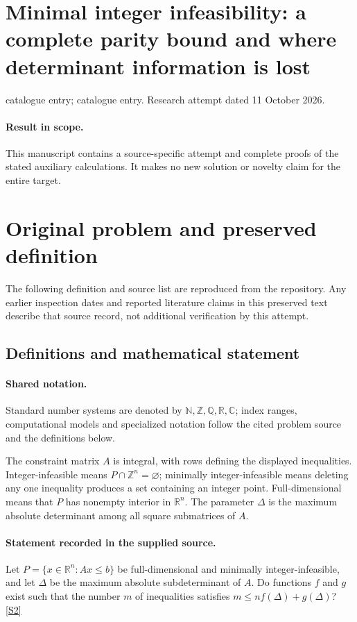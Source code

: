 \documentclass[11pt]{article}
\begin{document}
\section*{Minimal integer infeasibility: a complete parity bound and where determinant information is lost}
\noindent catalogue entry; catalogue entry. Research attempt dated 11 October 2026.
\paragraph{Result in scope.}This manuscript contains a source-specific attempt and complete proofs of the stated auxiliary calculations. It makes no new solution or novelty claim for the entire target.
\section{Original problem and preserved definition}
The following definition and source list are reproduced from the repository. Any earlier inspection dates and reported literature claims in this preserved text describe that source record, not additional verification by this attempt.
\subsection{Definitions and mathematical statement}

\paragraph{Shared notation.}Standard number systems are denoted by $\mathbb N,\mathbb Z,\mathbb Q,\mathbb R,\mathbb C$; index ranges, computational models and specialized notation follow the cited problem source and the definitions below.


The constraint matrix $A$ is integral, with rows defining the displayed inequalities. Integer-infeasible means $P\cap\mathbb Z^n=\varnothing$; minimally integer-infeasible means deleting any one inequality produces a set containing an integer point. Full-dimensional means that $P$ has nonempty interior in $\mathbb R^n$. The parameter $\Delta$ is the maximum absolute determinant among all square submatrices of $A$.
\paragraph{Statement recorded in the supplied source.}
Let $P=\{x\in\mathbb R^n:Ax\leq b\}$ be full-dimensional and minimally integer-infeasible, and let $\Delta$ be the maximum absolute subdeterminant of $A$. Do functions $f$ and $g$ exist such that the number $m$ of inequalities satisfies $m\leq nf(\Delta)+g(\Delta)$? \href{https://doi.org/10.4171/owr/2021/53}{[S2]}
\end{document}
